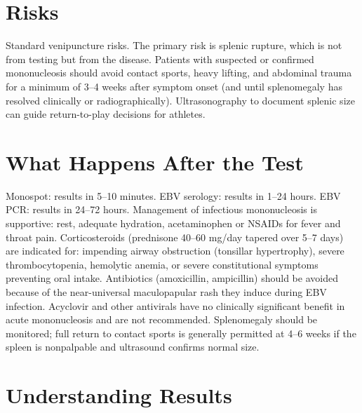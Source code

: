 \section*{Risks}
Standard venipuncture risks. The primary risk is splenic rupture, which is not from testing but from the disease. Patients with suspected or confirmed mononucleosis should avoid contact sports, heavy lifting, and abdominal trauma for a minimum of 3--4 weeks after symptom onset (and until splenomegaly has resolved clinically or radiographically). Ultrasonography to document splenic size can guide return-to-play decisions for athletes.

\section*{What Happens After the Test}
Monospot: results in 5--10 minutes. EBV serology: results in 1--24 hours. EBV PCR: results in 24--72 hours. Management of infectious mononucleosis is supportive: rest, adequate hydration, acetaminophen or NSAIDs for fever and throat pain. Corticosteroids (prednisone 40--60 mg/day tapered over 5--7 days) are indicated for: impending airway obstruction (tonsillar hypertrophy), severe thrombocytopenia, hemolytic anemia, or severe constitutional symptoms preventing oral intake. Antibiotics (amoxicillin, ampicillin) should be avoided because of the near-universal maculopapular rash they induce during EBV infection. Acyclovir and other antivirals have no clinically significant benefit in acute mononucleosis and are not recommended. Splenomegaly should be monitored; full return to contact sports is generally permitted at 4--6 weeks if the spleen is nonpalpable and ultrasound confirms normal size.

\section*{Understanding Results}

